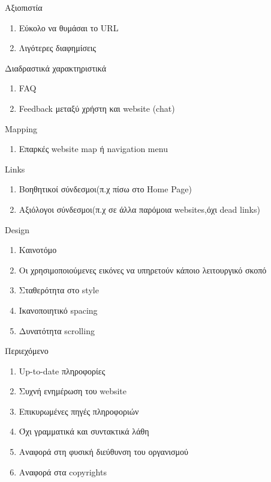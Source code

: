 	\item Αξιοπιστία
	\begin{enumerate}
		\item Εύκολο να θυμάσαι το URL
		\item Λιγότερες διαφημίσεις 
	\end{enumerate}
	\item Διαδραστικά χαρακτηριστικά
	\begin{enumerate}
		\item FAQ
		\item Feedback μεταξύ χρήστη και website (chat)
	\end{enumerate}
	\item Mapping
	\begin{enumerate}
		\item Επαρκές website map ή navigation menu
	\end{enumerate}
	\item Links
	\begin{enumerate}
		\item Βοηθητικοί σύνδεσμοι(π.χ πίσω στο Home Page)
		\item Αξιόλογοι σύνδεσμοι(π.χ σε άλλα παρόμοια websites,όχι dead links)
	\end{enumerate}
	\item Design
	\begin{enumerate}
		\item Καινοτόμο 
		\item Οι χρησιμοποιούμενες εικόνες να υπηρετούν κάποιο λειτουργικό σκοπό
		\item Σταθερότητα στο style
		\item Ικανοποιητικό spacing
		\item Δυνατότητα scrolling
	\end{enumerate}
	\item Περιεχόμενο
	\begin{enumerate}
		\item Up-to-date πληροφορίες
		\item Συχνή ενημέρωση του website
		\item Επικυρωμένες πηγές πληροφοριών
		\item Όχι γραμματικά και συντακτικά λάθη
		\item Αναφορά στη φυσική διεύθυνση του οργανισμού
		\item Αναφορά στα copyrights
	\end{enumerate}